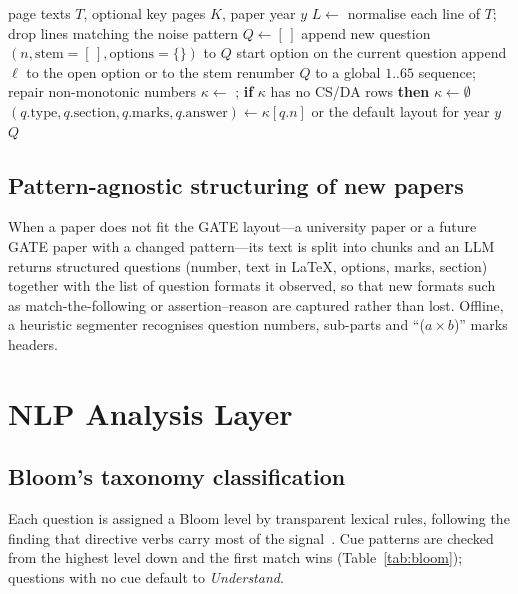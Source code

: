\begin{algorithm}[t]
\caption{GATE paper parsing and answer-key join}
\label{alg:parse}
\begin{algorithmic}[1]
\Require page texts $T$, optional key pages $K$, paper year $y$
\State $L \gets$ normalise each line of $T$; drop lines matching the noise pattern
\State $Q \gets [\,]$
   \State append new question $(n, \text{stem}=[\,], \text{options}=\{\})$ to $Q$
   \State start option on the current question
  \Else \State append $\ell$ to the open option or to the stem
  \EndIf
\EndFor
\State renumber $Q$ to a global $1..65$ sequence; repair non-monotonic numbers
\State $\kappa \gets$ ; \textbf{if} $\kappa$ has no CS/DA rows \textbf{then} $\kappa \gets \emptyset$
  \State $(q.\text{type}, q.\text{section}, q.\text{marks}, q.\text{answer}) \gets \kappa[q.n]$ or the default layout for year $y$
\EndFor
\State \Return $Q$
\end{algorithmic}
\end{algorithm}

\subsection{Pattern-agnostic structuring of new papers}
When a paper does not fit the GATE layout---a university paper or a future GATE paper with a changed pattern---its text
is split into chunks and an LLM returns structured questions (number, text in LaTeX, options, marks, section) together
with the list of question formats it observed, so that new formats such as match-the-following or assertion--reason are
captured rather than lost. Offline, a heuristic segmenter recognises question numbers, sub-parts and
``($a\times b$)'' marks headers.

\section{NLP Analysis Layer}
\subsection{Bloom's taxonomy classification}
Each question is assigned a Bloom level by transparent lexical rules, following the finding that directive verbs carry
most of the signal~\cite{mohammed2020}. Cue patterns are checked from the highest level down and the first match wins
(Table~\ref{tab:bloom}); questions with no cue default to \emph{Understand}.

